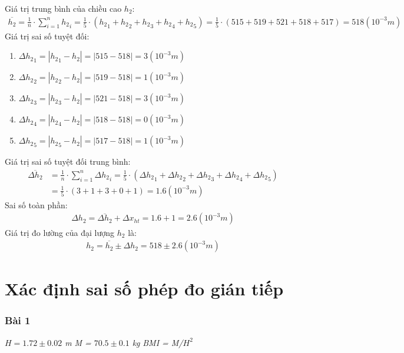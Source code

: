 \documentclass{article}
\begin{document}
Giá trị trung bình của chiều cao $h_2$:
\begin{align*}
    \overline{h_2} = \frac{1}{n}\cdot\sum_{i = 1}^{n}{h_2}_i = \frac{1}{5}\cdot({h_2}_1 + {h_2}_2 + {h_2}_3 + {h_2}_4 + {h_2}_5) = \frac{1}{5}\cdot(515 + 519 + 521 + 518 + 517) = 518(10^{-3} m)
\end{align*}
Giá trị sai số tuyệt đối:
\begin{enumerate}
    \item $\Delta {h_2}_1 = |{h_2}_1 - h_2| = |515 - 518| = 3(10^{-3} m)$
    \item $\Delta {h_2}_2 = |{h_2}_2 - h_2| = |519 - 518| = 1(10^{-3} m)$
    \item $\Delta {h_2}_3 = |{h_2}_3 - h_2| = |521 - 518| = 3(10^{-3} m)$
    \item $\Delta {h_2}_4 = |{h_2}_4 - h_2| = |518 - 518| = 0(10^{-3} m)$
    \item $\Delta {h_2}_5 = |{h_2}_5 - h_2| = |517 - 518| = 1(10^{-3} m)$
\end{enumerate}
Giá trị sai số tuyệt đối trung bình:
\begin{align*}
    \overline{\Delta h_2} &= \frac{1}{n}\cdot\sum_{i=1}^{n}\Delta {h_2}_i = \frac{1}{5}\cdot(\Delta {h_2}_1 + \Delta {h_2}_2 + \Delta {h_2}_3 + \Delta {h_2}_4 + \Delta {h_2}_5)\\ 
    &=  \frac{1}{5}\cdot(3 + 1 + 3 + 0 + 1) = 1.6(10^{-3} m)
\end{align*}
Sai số toàn phần:
\begin{align*}
    \Delta h_2 = \overline{\Delta h_2} + \Delta x_{ht} =1.6 + 1 =2.6(10^{-3} m) 
\end{align*}
Giá trị đo lường của đại lượng $h_2$ là:
\begin{align*}
    h_2 = \overline{h_2} \pm \Delta h_2 = 518 \pm 2.6(10^{-3} m)
\end{align*}



\section*{Xác định sai số phép đo gián tiếp}
\subsubsection*{Bài 1}
\textit{$H = 1.72 \pm 0.02$ m} \textit{M = $70.5 \pm 0.1$ kg} \textit{BMI = M/$H^2$}\\
\end{document}
